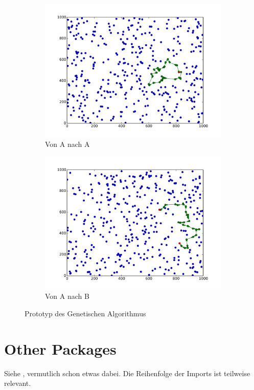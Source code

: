 \begin{figure}[H]
	\centering
	\begin{subfigure}{0.49\textwidth}
		\centering
		\includegraphics[width=\linewidth,trim=1cm 1cm 1cm 1cm,clip]{fig/genalg-proto-tsp}
		\caption{Von A nach A}
		\label{fig:genalg-proto-tsp}
	\end{subfigure}
	\begin{subfigure}{0.49\textwidth}
		\centering
		\includegraphics[width=\linewidth,trim=1cm 1cm 1cm 1cm,clip]{fig/genalg-proto-route}
		\caption{Von A nach B}
		\label{fig:genalg-proto-route}
	\end{subfigure}
	\caption{Prototyp des Genetischen Algorithmus}
	\label{fig:genalg-proto}
\end{figure}

\section{Other Packages}
Siehe , vermutlich schon etwas dabei. Die Reihenfolge der Imports ist teilweise relevant.